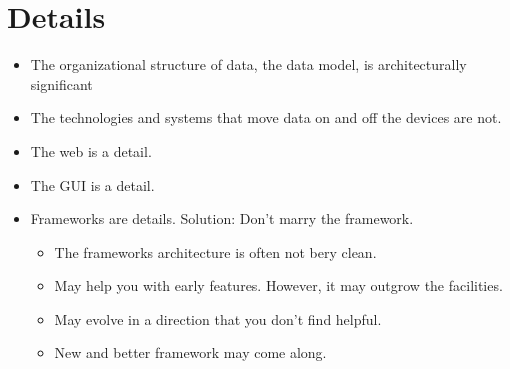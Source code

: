 \documentclass[../Main.tex]{subfiles}
\begin{document}
\section{Details}
\begin{itemize}
    \item The organizational structure of data, the data model, is architecturally significant
    \item The technologies and systems that move data on and off the devices are not.
    \item The web is a detail.
    \item The GUI is a detail.
    \item Frameworks are details. Solution: Don't marry the framework.
          \begin{itemize}
              \item The frameworks architecture is often not bery clean.
              \item May help you with early features. However, it may outgrow the facilities.
              \item May evolve in a direction that you don't find helpful.
              \item New and better framework may come along.
          \end{itemize}
\end{itemize}
\end{document}
